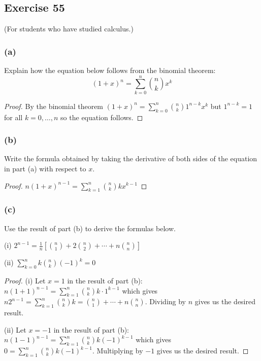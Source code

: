 \documentclass[14pt]{extarticle}
\newcommand{\dps}{\displaystyle}
\begin{document}
\subsection{Exercise 55}
(For students who have studied calculus.)

\subsubsection{(a)}
Explain how the equation below follows from the binomial theorem:
\[
     (1+x)^n = \sum_{k=0}^{n} \binom{n}{k} x^k
\]
\begin{proof}
     By the binomial theorem \((1+x)^n = \sum_{k=0}^{n} \binom{n}{k} 1^{n-k}x^k\) but \(1^{n-k}=1\) for all \(k= 0, \ldots, n\)
     so the equation follows.
\end{proof}

\subsubsection{(b)}
Write the formula obtained by taking the derivative of both sides of the equation in part (a) with respect to \(x\).

\begin{proof}
     \(n(1+x)^{n-1} = \sum_{k=1}^n \binom{n}{k}kx^{k-1}\)
\end{proof}

\subsubsection{(c)}
Use the result of part (b) to derive the formulas below.

(i) \(\dps 2^{n-1} = \frac{1}{n}\left[\binom{n}{1} + 2\binom{n}{2} + \cdots + n\binom{n}{n}\right]\)

(ii) \(\dps \sum_{k=0}^{n} k \binom{n}{k} (-1)^k = 0\)

\begin{proof}
     (i) Let \(x = 1\) in the result of part (b): \(n(1+1)^{n-1} = \sum_{k=1}^n \binom{n}{k}k \cdot 1^{k-1}\) which gives
     \(n2^{n-1} = \sum_{k=1}^n \binom{n}{k}k = \binom{n}{1} + \cdots + n\binom{n}{n}\). Dividing by \(n\) gives us the
     desired result.

     (ii) Let \(x = -1\) in the result of part (b): \(n(1-1)^{n-1} = \sum_{k=1}^n \binom{n}{k}k (-1)^{k-1}\) which gives
     \(0 = \sum_{k=1}^n \binom{n}{k}k (-1)^{k-1}\). Multiplying by \(-1\) gives us the desired result.
\end{proof}
\end{document}
